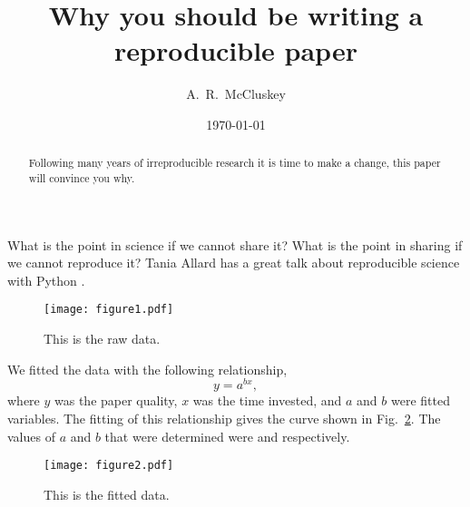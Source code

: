 \documentclass[amsmath,amssymb,twocolumn,superscriptaddress,aps,prl]{revtex4-1}
\begin{document}
\title{Why you should be writing a reproducible paper}

\author{A.~R.~McCluskey}

\date{\today}

\begin{abstract}
  Following many years of irreproducible research it is time to make a change, this paper will convince you why.
\end{abstract}

\maketitle

What is the point in science if we cannot share it?
What is the point in sharing if we cannot reproduce it?
Tania Allard has a great talk about reproducible science with Python \cite{Allard2018}.

\begin{figure}
  \centering
  \texttt{[image: figure1.pdf]}
  \caption{\small This is the raw data.}
  \label{fig:raw}
\end{figure}

We fitted the data with the following relationship,
%
\begin{equation}
  y = a^{bx},
\end{equation}
%
where $y$ was the paper quality, $x$ was the time invested, and $a$ and $b$ were fitted variables.
The fitting of this relationship gives the curve shown in Fig.~\ref{fig:fit}.
The values of $a$ and $b$ that were determined were  and  respectively.

\begin{figure}
  \centering
  \texttt{[image: figure2.pdf]}
  \caption{\small This is the fitted data.}
  \label{fig:fit}
\end{figure}

\lipsum


\end{document}
